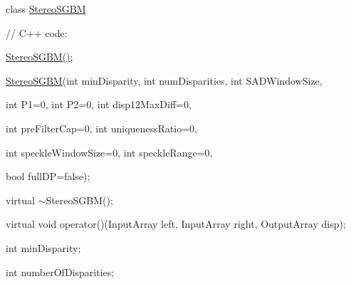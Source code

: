 class \mbox{\hyperlink{classorg_1_1opencv_1_1calib3d_1_1_stereo_s_g_b_m}{Stereo\+S\+G\+BM}} {\ttfamily }

{\ttfamily }

{\ttfamily }

{\ttfamily // C++ code\+:}

{\ttfamily }

{\ttfamily }

{\ttfamily \mbox{\hyperlink{classorg_1_1opencv_1_1calib3d_1_1_stereo_s_g_b_m_a08dc75ba449a7f4915a258606bbd5e54}{Stereo\+S\+G\+B\+M()}};}

{\ttfamily }

{\ttfamily }

{\ttfamily \mbox{\hyperlink{classorg_1_1opencv_1_1calib3d_1_1_stereo_s_g_b_m}{Stereo\+S\+G\+BM}}(int min\+Disparity, int num\+Disparities, int S\+A\+D\+Window\+Size,}

{\ttfamily }

{\ttfamily }

{\ttfamily int P1=0, int P2=0, int disp12\+Max\+Diff=0,}

{\ttfamily }

{\ttfamily }

{\ttfamily int pre\+Filter\+Cap=0, int uniqueness\+Ratio=0,}

{\ttfamily }

{\ttfamily }

{\ttfamily int speckle\+Window\+Size=0, int speckle\+Range=0,}

{\ttfamily }

{\ttfamily }

{\ttfamily bool full\+DP=false);}

{\ttfamily }

{\ttfamily }

{\ttfamily virtual $\sim$\+Stereo\+S\+G\+B\+M();}

{\ttfamily }

{\ttfamily }

{\ttfamily virtual void operator()(\+Input\+Array left, Input\+Array right, Output\+Array disp);}

{\ttfamily }

{\ttfamily }

{\ttfamily int min\+Disparity;}

{\ttfamily }

{\ttfamily }

{\ttfamily int number\+Of\+Disparities;}

{\ttfamily }

